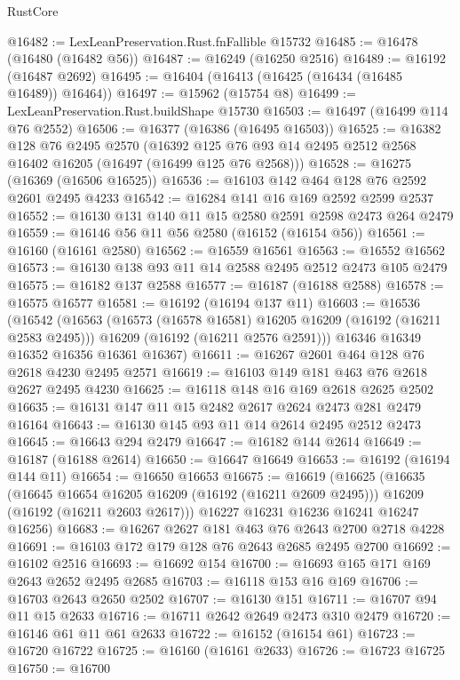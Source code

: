\begin{lexlean}{RustCore}
\begin{coremodule}
@16482 := LexLeanPreservation.Rust.fnFallible @15732
@16485 := @16478 (@16480 (@16482 @56))
@16487 := @16249 (@16250 @2516)
@16489 := @16192 (@16487 @2692)
@16495 := @16404 (@16413 (@16425 (@16434 (@16485 @16489)) @16464))
@16497 := @15962 (@15754 @8)
@16499 := LexLeanPreservation.Rust.buildShape @15730
@16503 := @16497 (@16499 @114 @76 @2552)
@16506 := @16377 (@16386 (@16495 @16503))
@16525 := @16382
    @128
    @76
    @2495
    @2570
    (@16392 @125 @76 @93 @14 @2495 @2512 @2568 @16402 @16205 (@16497 (@16499 @125 @76 @2568)))
@16528 := @16275 (@16369 (@16506 @16525))
@16536 := @16103 @142 @464 @128 @76 @2592 @2601 @2495 @4233
@16542 := @16284 @141 @16 @169 @2592 @2599 @2537
@16552 := @16130 @131 @140 @11 @15 @2580 @2591 @2598 @2473 @264 @2479
@16559 := @16146 @56 @11 @56 @2580 (@16152 (@16154 @56))
@16561 := @16160 (@16161 @2580)
@16562 := @16559 @16561
@16563 := @16552 @16562
@16573 := @16130 @138 @93 @11 @14 @2588 @2495 @2512 @2473 @105 @2479
@16575 := @16182 @137 @2588
@16577 := @16187 (@16188 @2588)
@16578 := @16575 @16577
@16581 := @16192 (@16194 @137 @11)
@16603 := @16536
    (@16542
      (@16563
        (@16573 (@16578 @16581) @16205 @16209 (@16192 (@16211 @2583 @2495)))
        @16209
        (@16192 (@16211 @2576 @2591)))
      @16346
      @16349
      @16352
      @16356
      @16361
      @16367)
@16611 := @16267 @2601 @464 @128 @76 @2618 @4230 @2495 @2571
@16619 := @16103 @149 @181 @463 @76 @2618 @2627 @2495 @4230
@16625 := @16118 @148 @16 @169 @2618 @2625 @2502
@16635 := @16131 @147 @11 @15 @2482 @2617 @2624 @2473 @281 @2479 @16164
@16643 := @16130 @145 @93 @11 @14 @2614 @2495 @2512 @2473
@16645 := @16643 @294 @2479
@16647 := @16182 @144 @2614
@16649 := @16187 (@16188 @2614)
@16650 := @16647 @16649
@16653 := @16192 (@16194 @144 @11)
@16654 := @16650 @16653
@16675 := @16619
    (@16625
      (@16635
        (@16645 @16654 @16205 @16209 (@16192 (@16211 @2609 @2495)))
        @16209
        (@16192 (@16211 @2603 @2617)))
      @16227
      @16231
      @16236
      @16241
      @16247
      @16256)
@16683 := @16267 @2627 @181 @463 @76 @2643 @2700 @2718 @4228
@16691 := @16103 @172 @179 @128 @76 @2643 @2685 @2495 @2700
@16692 := @16102 @2516
@16693 := @16692 @154
@16700 := @16693 @165 @171 @169 @2643 @2652 @2495 @2685
@16703 := @16118 @153 @16 @169
@16706 := @16703 @2643 @2650 @2502
@16707 := @16130 @151
@16711 := @16707 @94 @11 @15 @2633
@16716 := @16711 @2642 @2649 @2473 @310 @2479
@16720 := @16146 @61 @11 @61 @2633
@16722 := @16152 (@16154 @61)
@16723 := @16720 @16722
@16725 := @16160 (@16161 @2633)
@16726 := @16723 @16725
@16750 := @16700

\end{coremodule}
\end{lexlean}
